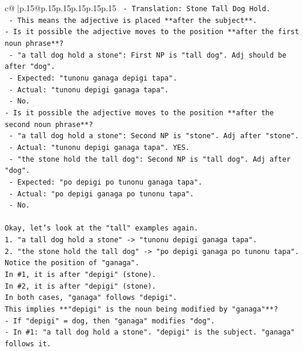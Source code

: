 \documentclass{article}
\begin{document}
{\begin{supertabular}{c@{$\;$}|p{.15\linewidth}@{}p{.15\linewidth}p{.15\linewidth}p{.15\linewidth}p{.15\linewidth}p{.15\linewidth}}
{{{\texttt{  {-} Translation: Stone Tall Dog Hold.} \\
\texttt{  {-} This means the adjective is placed **after the subject**.} \\
\texttt{{-} Is it possible the adjective moves to the position **after the first noun phrase**?} \\
\texttt{  {-} "a tall dog hold a stone": First NP is "tall dog". Adj should be after "dog".} \\
\texttt{    {-} Expected: "tunonu ganaga depigi tapa".} \\
\texttt{    {-} Actual: "tunonu depigi ganaga tapa".} \\
\texttt{    {-} No.} \\
\texttt{{-} Is it possible the adjective moves to the position **after the second noun phrase**?} \\
\texttt{  {-} "a tall dog hold a stone": Second NP is "stone". Adj after "stone".} \\
\texttt{    {-} Actual: "tunonu depigi ganaga tapa". YES.} \\
\texttt{  {-} "the stone hold the tall dog": Second NP is "tall dog". Adj after "dog".} \\
\texttt{    {-} Expected: "po depigi po tunonu ganaga tapa".} \\
\texttt{    {-} Actual: "po depigi ganaga po tunonu tapa".} \\
\texttt{    {-} No.} \\
\\ 
\texttt{Okay, let's look at the "tall" examples again.} \\
\texttt{1. "a tall dog hold a stone" {-}> "tunonu depigi ganaga tapa".} \\
\texttt{2. "the stone hold the tall dog" {-}> "po depigi ganaga po tunonu tapa".} \\
\texttt{Notice the position of "ganaga".} \\
\texttt{In \#1, it is after "depigi" (stone).} \\
\texttt{In \#2, it is after "depigi" (stone).} \\
\texttt{In both cases, "ganaga" follows "depigi".} \\
\texttt{This implies **"depigi" is the noun being modified by "ganaga"**?} \\
\texttt{{-} If "depigi" = dog, then "ganaga" modifies "dog".} \\
\texttt{{-} In \#1: "a tall dog hold a stone". "depigi" is the subject. "ganaga" follows it.} \\
}}}
\end{supertabular}}
\end{document}
